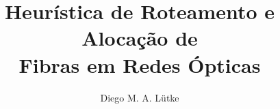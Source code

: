 \title{Heurística de Roteamento e Alocação de \\ Fibras em Redes Ópticas}

\author{Diego M. A. Lütke}


\address{Escola Politécnica -- Pontifícia Universidade Católica do Paraná (PUCPR)
}
